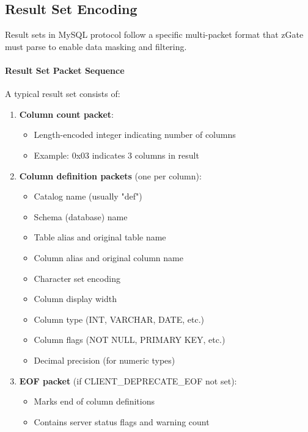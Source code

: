 \subsection{Result Set Encoding}

Result sets in MySQL protocol follow a specific multi-packet format that zGate must parse to enable data masking and filtering.

\paragraph{Result Set Packet Sequence}

A typical result set consists of:

\begin{enumerate}
    \item \textbf{Column count packet}:
    \begin{itemize}
        \item Length-encoded integer indicating number of columns
        \item Example: 0x03 indicates 3 columns in result
    \end{itemize}
    
    \item \textbf{Column definition packets} (one per column):
    \begin{itemize}
        \item Catalog name (usually "def")
        \item Schema (database) name
        \item Table alias and original table name
        \item Column alias and original column name
        \item Character set encoding
        \item Column display width
        \item Column type (INT, VARCHAR, DATE, etc.)
        \item Column flags (NOT NULL, PRIMARY KEY, etc.)
        \item Decimal precision (for numeric types)
    \end{itemize}
    
    \item \textbf{EOF packet} (if CLIENT\_DEPRECATE\_EOF not set):
    \begin{itemize}
        \item Marks end of column definitions
        \item Contains server status flags and warning count
    \end{itemize}
    

\end{enumerate}

